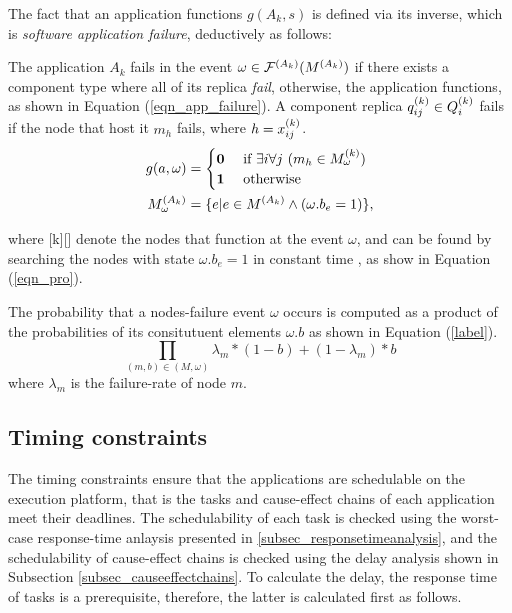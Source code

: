 The fact that an application functions $g(A_k, s)$ is defined via its inverse, which is \textit{software application failure}, deductively as follows:
\begin{definition}
The application $A_k$ fails in the event $\omega \in \ssp{\mathcal{F}}(\ssp{M})$ if there exists a component type  where all of its replica  \textit{fail}, otherwise, the application functions, as shown in Equation (\ref{eqn_app_failure}).  A component replica $\sss{q}[k][ij]\in \sss{Q}$ fails if the node that host it $m_h$ fails, where $h=x^{(k)}_{ij}$.  
\begin{align}
\label{eqn_app_failure}
g(a, \omega)&= 
\begin{cases}
\textbf{0} & \mbox{ if } \exists i\forall j\ (m_h\in \sss{M}[k][\omega] )\\
\textbf{1} & \mbox{ otherwise }
\end{cases}\\
\label{eqn_appreliability_node_s}
\sss{M}[A_k][\omega]&=\{e|e\in \ssp{M} \land (\omega.b_e=1) \},
\end{align}
\end{definition}
where [k][\omega] denote the nodes that function at the event $\omega$, and can be found by searching the nodes  with state $\omega.b_e=1$ in constant time , as show in Equation (\ref{eqn_pro}).

The probability that a nodes-failure event $\omega$ occurs is computed as a product of the probabilities of its consitutuent elements $\omega.b$ as shown in Equation (\ref{label}).
\begin{equation}
\label{eqn_pro}
	\prod_{(m,b)\in (M,\omega)}{\lambda_m*(1-b)+(1-\lambda_m)*b}
\end{equation}
where $\lambda_m$ is the failure-rate of node $m$.

\subsection{Timing constraints}
The timing constraints ensure that the applications are schedulable on the execution platform, that is the tasks and cause-effect chains of each application meet their deadlines. The schedulability of each task is checked using the worst-case response-time anlaysis presented in \ref{subsec_responsetimeanalysis}, and the schedulability of cause-effect chains is checked using the delay analysis shown in Subsection \ref{subsec_causeeffectchains}. To calculate the delay, the response time of tasks is a prerequisite, therefore, the latter is calculated first as follows.

